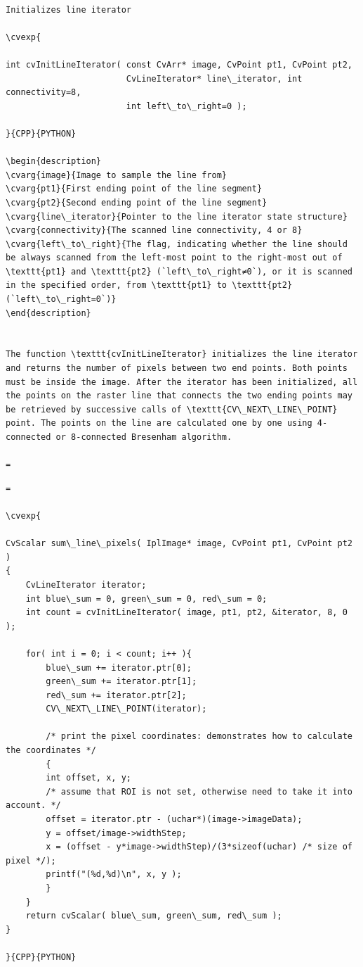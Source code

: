 \begin{verbatim}

Initializes line iterator

\cvexp{

int cvInitLineIterator( const CvArr* image, CvPoint pt1, CvPoint pt2,
                        CvLineIterator* line\_iterator, int connectivity=8,
                        int left\_to\_right=0 );

}{CPP}{PYTHON}

\begin{description}
\cvarg{image}{Image to sample the line from}
\cvarg{pt1}{First ending point of the line segment}
\cvarg{pt2}{Second ending point of the line segment}
\cvarg{line\_iterator}{Pointer to the line iterator state structure}
\cvarg{connectivity}{The scanned line connectivity, 4 or 8}
\cvarg{left\_to\_right}{The flag, indicating whether the line should be always scanned from the left-most point to the right-most out of \texttt{pt1} and \texttt{pt2} (`left\_to\_right≠0`), or it is scanned in the specified order, from \texttt{pt1} to \texttt{pt2} (`left\_to\_right=0`)}
\end{description}


The function \texttt{cvInitLineIterator} initializes the line iterator and returns the number of pixels between two end points. Both points must be inside the image. After the iterator has been initialized, all the points on the raster line that connects the two ending points may be retrieved by successive calls of \texttt{CV\_NEXT\_LINE\_POINT} point. The points on the line are calculated one by one using 4-connected or 8-connected Bresenham algorithm.

=\end{verbatim}
\label{Example. Using line iterator to calculate sum of pixel values along the color line}
\begin{verbatim}=

\cvexp{

CvScalar sum\_line\_pixels( IplImage* image, CvPoint pt1, CvPoint pt2 )
{
    CvLineIterator iterator;
    int blue\_sum = 0, green\_sum = 0, red\_sum = 0;
    int count = cvInitLineIterator( image, pt1, pt2, &iterator, 8, 0 );

    for( int i = 0; i < count; i++ ){
        blue\_sum += iterator.ptr[0];
        green\_sum += iterator.ptr[1];
        red\_sum += iterator.ptr[2];
        CV\_NEXT\_LINE\_POINT(iterator);

        /* print the pixel coordinates: demonstrates how to calculate the coordinates */
        {
        int offset, x, y;
        /* assume that ROI is not set, otherwise need to take it into account. */
        offset = iterator.ptr - (uchar*)(image->imageData);
        y = offset/image->widthStep;
        x = (offset - y*image->widthStep)/(3*sizeof(uchar) /* size of pixel */);
        printf("(%d,%d)\n", x, y );
        }
    }
    return cvScalar( blue\_sum, green\_sum, red\_sum );
}

}{CPP}{PYTHON}


\end{verbatim}
